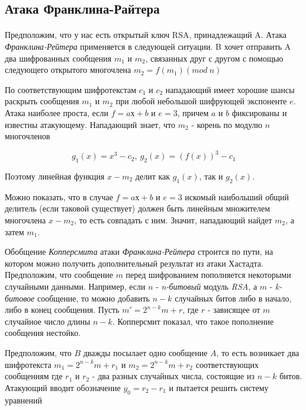 \subsection{Атака Франклина-Райтера}

\paragraph{} Предположим, что у нас есть открытый ключ RSA, принадлежащий A. Атака \textit{Франклина-Рейтера} применяется в следующей ситуации. B хочет отправить A два шифрованных 
  сообщения $m_1$ и $m_2$, связанных друг с другом с помощью следующего открытого многочлена $ m_2 = f(m_1)(mod \: n) $
  
  По соответствующим шифротекстам $c_1$ и $c_2$ нападающий имеет хорошие шансы раскрыть сообщения $m_1$ и $m_2$ при любой небольшой
  шифрующей экспоненте $e$. Атака наиболее проста, если $f = aх + b $ и $e=3$, причем $a$ и $b$ фиксированы и известны атакующему. 
  Нападающий знает, что $m_2$ - корень по модулю $n$ многочленов
  
    \begin{equation}
      g_1(x) = x^3 - c_2, \: g_2(x) = (f(x))^3 - c_1
    \end{equation}

  Поэтому линейная функция $x - m_{2}$ делит как $ g_1(x) $, так и $ g_2(x) $.
  
  Можно показать, что в случае $f = aх + b$ и $e = 3$ искомый наибольший общий делитель (если таковой существует) должен быть линейным множителем 
  многочлена $x - m_2$, то есть совпадать с ним. Значит, нападающий найдет $m_2$, а затем $m_1$.
  
  Обобщение \textit{Копперсмита} атаки \textit{Франклина-Рейтера} строится по пути, на котором можно получить дополнительный результат из атаки Хастадта. Предположим, что сообщение $m$ 
  перед шифрованием пополняется некоторыми случайными данными. Например, если $n$ - \textit{n-битовый} модуль \textit{RSA}, а $m$ - \textit{k-битовое} сообщение, 
  то можно добавить $n-k$ случайных битов либо в начало, либо в конец сообщения. Пусть $m' = 2^{n-k}m + r $, где $r$ - зависящее от 
  $m$ случайное число длины $n-k$. Копперсмит показал, что такое пополнение сообщения нестойко.
  
  Предположим, что $B$ дважды посылает одно сообщение $A$, то есть возникает два шифротекста $ m_1 = 2^{n-k}m + r_1 $ и
  $ m_2 = 2^{n-k}m + r_2 $ соответствующих сообщениям где $r_1$ и $r_2$ - два разных случайных числа, состоящие из 
  $n - k$ битов. Атакующий вводит обозначение $ y_0 = r_2 - r_1 $ и пытается решить
  систему уравнений
  

